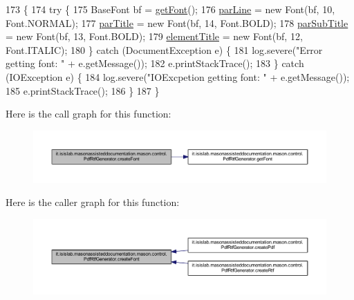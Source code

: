 \begin{DoxyCode}
173                               \{     
174         \textcolor{keywordflow}{try} \{
175             BaseFont bf = \hyperlink{classit_1_1isislab_1_1masonassisteddocumentation_1_1mason_1_1control_1_1_pdf_rtf_generator_ae256fb15c0845470ad900c876a15fabf}{getFont}();
176             \hyperlink{classit_1_1isislab_1_1masonassisteddocumentation_1_1mason_1_1control_1_1_pdf_rtf_generator_ae24c4a1666a5d601e16f3c3cb7a81fdb}{parLine} = \textcolor{keyword}{new} Font(bf, 10, Font.NORMAL);
177             \hyperlink{classit_1_1isislab_1_1masonassisteddocumentation_1_1mason_1_1control_1_1_pdf_rtf_generator_a3f130f576b5be4a3a82d7c59347c0869}{parTitle} = \textcolor{keyword}{new} Font(bf, 14, Font.BOLD);
178             \hyperlink{classit_1_1isislab_1_1masonassisteddocumentation_1_1mason_1_1control_1_1_pdf_rtf_generator_ae31536bac40b23df15fbb252e60c03bb}{parSubTitle} = \textcolor{keyword}{new} Font(bf, 13, Font.BOLD);
179             \hyperlink{classit_1_1isislab_1_1masonassisteddocumentation_1_1mason_1_1control_1_1_pdf_rtf_generator_aa954332a7d987f1b6b8957fa25ee6190}{elementTitle} = \textcolor{keyword}{new} Font(bf, 12, Font.ITALIC);
180         \} \textcolor{keywordflow}{catch} (DocumentException e) \{
181             log.severe(\textcolor{stringliteral}{"Error getting font: "} + e.getMessage());
182             e.printStackTrace();
183         \} \textcolor{keywordflow}{catch} (IOException e) \{
184             log.severe(\textcolor{stringliteral}{"IOExcpetion getting font: "} + e.getMessage());
185             e.printStackTrace();
186         \}           
187     \}
\end{DoxyCode}


Here is the call graph for this function\-:
\nopagebreak
\begin{figure}[H]
\begin{center}
\leavevmode
\includegraphics[width=350pt]{classit_1_1isislab_1_1masonassisteddocumentation_1_1mason_1_1control_1_1_pdf_rtf_generator_af1f9a21f995c47a9e1a5a6f276c97852_cgraph}
\end{center}
\end{figure}




Here is the caller graph for this function\-:
\nopagebreak
\begin{figure}[H]
\begin{center}
\leavevmode
\includegraphics[width=350pt]{classit_1_1isislab_1_1masonassisteddocumentation_1_1mason_1_1control_1_1_pdf_rtf_generator_af1f9a21f995c47a9e1a5a6f276c97852_icgraph}
\end{center}
\end{figure}


